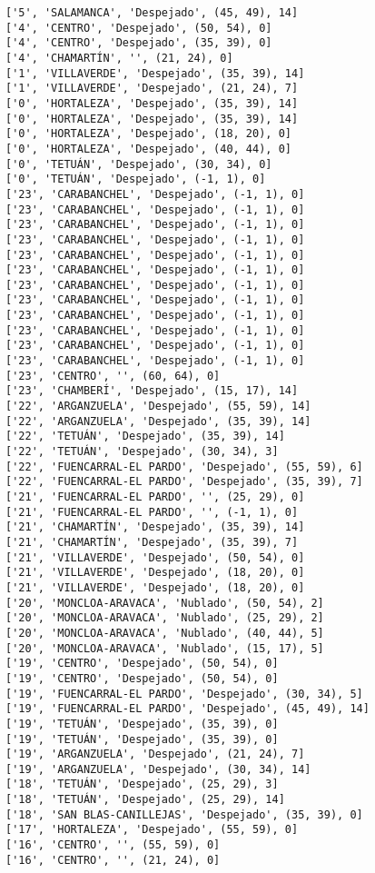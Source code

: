 \documentclass[11pt]{article}
\begin{document}
\begin{Verbatim}[commandchars=\\\{\}]
['5', 'SALAMANCA', 'Despejado', (45, 49), 14]
['4', 'CENTRO', 'Despejado', (50, 54), 0]
['4', 'CENTRO', 'Despejado', (35, 39), 0]
['4', 'CHAMARTÍN', '', (21, 24), 0]
['1', 'VILLAVERDE', 'Despejado', (35, 39), 14]
['1', 'VILLAVERDE', 'Despejado', (21, 24), 7]
['0', 'HORTALEZA', 'Despejado', (35, 39), 14]
['0', 'HORTALEZA', 'Despejado', (35, 39), 14]
['0', 'HORTALEZA', 'Despejado', (18, 20), 0]
['0', 'HORTALEZA', 'Despejado', (40, 44), 0]
['0', 'TETUÁN', 'Despejado', (30, 34), 0]
['0', 'TETUÁN', 'Despejado', (-1, 1), 0]
['23', 'CARABANCHEL', 'Despejado', (-1, 1), 0]
['23', 'CARABANCHEL', 'Despejado', (-1, 1), 0]
['23', 'CARABANCHEL', 'Despejado', (-1, 1), 0]
['23', 'CARABANCHEL', 'Despejado', (-1, 1), 0]
['23', 'CARABANCHEL', 'Despejado', (-1, 1), 0]
['23', 'CARABANCHEL', 'Despejado', (-1, 1), 0]
['23', 'CARABANCHEL', 'Despejado', (-1, 1), 0]
['23', 'CARABANCHEL', 'Despejado', (-1, 1), 0]
['23', 'CARABANCHEL', 'Despejado', (-1, 1), 0]
['23', 'CARABANCHEL', 'Despejado', (-1, 1), 0]
['23', 'CARABANCHEL', 'Despejado', (-1, 1), 0]
['23', 'CARABANCHEL', 'Despejado', (-1, 1), 0]
['23', 'CENTRO', '', (60, 64), 0]
['23', 'CHAMBERÍ', 'Despejado', (15, 17), 14]
['22', 'ARGANZUELA', 'Despejado', (55, 59), 14]
['22', 'ARGANZUELA', 'Despejado', (35, 39), 14]
['22', 'TETUÁN', 'Despejado', (35, 39), 14]
['22', 'TETUÁN', 'Despejado', (30, 34), 3]
['22', 'FUENCARRAL-EL PARDO', 'Despejado', (55, 59), 6]
['22', 'FUENCARRAL-EL PARDO', 'Despejado', (35, 39), 7]
['21', 'FUENCARRAL-EL PARDO', '', (25, 29), 0]
['21', 'FUENCARRAL-EL PARDO', '', (-1, 1), 0]
['21', 'CHAMARTÍN', 'Despejado', (35, 39), 14]
['21', 'CHAMARTÍN', 'Despejado', (35, 39), 7]
['21', 'VILLAVERDE', 'Despejado', (50, 54), 0]
['21', 'VILLAVERDE', 'Despejado', (18, 20), 0]
['21', 'VILLAVERDE', 'Despejado', (18, 20), 0]
['20', 'MONCLOA-ARAVACA', 'Nublado', (50, 54), 2]
['20', 'MONCLOA-ARAVACA', 'Nublado', (25, 29), 2]
['20', 'MONCLOA-ARAVACA', 'Nublado', (40, 44), 5]
['20', 'MONCLOA-ARAVACA', 'Nublado', (15, 17), 5]
['19', 'CENTRO', 'Despejado', (50, 54), 0]
['19', 'CENTRO', 'Despejado', (50, 54), 0]
['19', 'FUENCARRAL-EL PARDO', 'Despejado', (30, 34), 5]
['19', 'FUENCARRAL-EL PARDO', 'Despejado', (45, 49), 14]
['19', 'TETUÁN', 'Despejado', (35, 39), 0]
['19', 'TETUÁN', 'Despejado', (35, 39), 0]
['19', 'ARGANZUELA', 'Despejado', (21, 24), 7]
['19', 'ARGANZUELA', 'Despejado', (30, 34), 14]
['18', 'TETUÁN', 'Despejado', (25, 29), 3]
['18', 'TETUÁN', 'Despejado', (25, 29), 14]
['18', 'SAN BLAS-CANILLEJAS', 'Despejado', (35, 39), 0]
['17', 'HORTALEZA', 'Despejado', (55, 59), 0]
['16', 'CENTRO', '', (55, 59), 0]
['16', 'CENTRO', '', (21, 24), 0]

\end{Verbatim}
\end{document}
